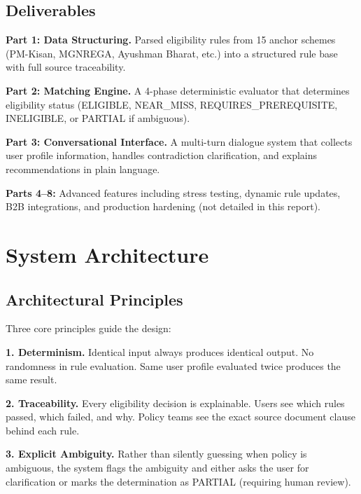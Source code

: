 \documentclass[11pt,a4paper]{report}
\newenvironment{keypoint}{%
  \begin{callout}%
}{%
  \end{callout}%
}
\begin{document}
\section{Deliverables}

\textbf{Part 1: Data Structuring.} Parsed eligibility rules from 15 anchor schemes (PM-Kisan, MGNREGA, Ayushman Bharat, etc.) into a structured rule base with full source traceability.

\textbf{Part 2: Matching Engine.} A 4-phase deterministic evaluator that determines eligibility status (ELIGIBLE, NEAR\_MISS, REQUIRES\_PREREQUISITE, INELIGIBLE, or PARTIAL if ambiguous).

\textbf{Part 3: Conversational Interface.} A multi-turn dialogue system that collects user profile information, handles contradiction clarification, and explains recommendations in plain language.

\textbf{Parts 4--8:} Advanced features including stress testing, dynamic rule updates, B2B integrations, and production hardening (not detailed in this report).

\chapter{System Architecture}

\section{Architectural Principles}

Three core principles guide the design:

\begin{keypoint}
\textbf{1. Determinism.} Identical input always produces identical output. No randomness in rule evaluation. Same user profile evaluated twice produces the same result.
\end{keypoint}

\begin{keypoint}
\textbf{2. Traceability.} Every eligibility decision is explainable. Users see which rules passed, which failed, and why. Policy teams see the exact source document clause behind each rule.
\end{keypoint}

\begin{keypoint}
\textbf{3. Explicit Ambiguity.} Rather than silently guessing when policy is ambiguous, the system flags the ambiguity and either asks the user for clarification or marks the determination as PARTIAL (requiring human review).
\end{keypoint}
\end{document}
